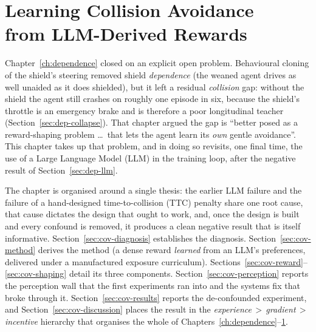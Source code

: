 
\chapter[Learning Collision Avoidance from LLM-Derived Rewards]{Learning Collision Avoidance\\ from LLM-Derived Rewards}\label{ch:llmreward}

Chapter~\ref{ch:dependence} closed on an explicit open problem. Behavioural cloning of the
shield's steering removed shield \emph{dependence} (the weaned agent drives as well unaided as
it does shielded), but it left a residual \emph{collision} gap: without the shield the agent
still crashes on roughly one episode in six, because the shield's throttle is an emergency brake
and is therefore a poor longitudinal teacher (Section~\ref{sec:dep-collapse}). That chapter
argued the gap is ``better posed as a reward-shaping problem \dots\ that lets the agent learn its
\emph{own} gentle avoidance''. This chapter takes up that problem, and in doing so revisits, one
final time, the use of a Large Language Model (LLM) in the training loop, after the negative
result of Section~\ref{sec:dep-llm}.

The chapter is organised around a single thesis: the earlier LLM failure and the failure of a
hand-designed time-to-collision (TTC) penalty share one root cause, that cause dictates the
design that ought to work, and, once the design is built and every confound is removed, it
produces a clean negative result that is itself informative. Section~\ref{sec:cov-diagnosis}
establishes the diagnosis. Section~\ref{sec:cov-method} derives the method (a dense reward
\emph{learned} from an LLM's preferences, delivered under a manufactured exposure curriculum).
Sections~\ref{sec:cov-reward}--\ref{sec:cov-shaping} detail its three components.
Section~\ref{sec:cov-perception} reports the perception wall that the first experiments ran into
and the systems fix that broke through it. Section~\ref{sec:cov-results} reports the
de-confounded experiment, and Section~\ref{sec:cov-discussion} places the result in the
\emph{experience\,$>$\,gradient\,$>$\,incentive} hierarchy that organises the whole of
Chapters~\ref{ch:dependence}--\ref{ch:llmreward}.

